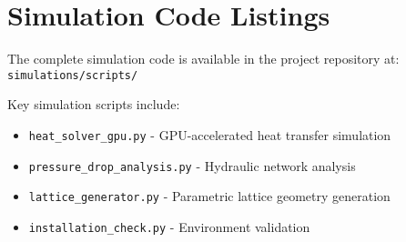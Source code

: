 \section{Simulation Code Listings}
\label{app:code}


The complete simulation code is available in the project repository at:
\texttt{simulations/scripts/}

Key simulation scripts include:
\begin{itemize}
    \item \texttt{heat\_solver\_gpu.py} - GPU-accelerated heat transfer simulation
    \item \texttt{pressure\_drop\_analysis.py} - Hydraulic network analysis
    \item \texttt{lattice\_generator.py} - Parametric lattice geometry generation
    \item \texttt{installation\_check.py} - Environment validation
\end{itemize}